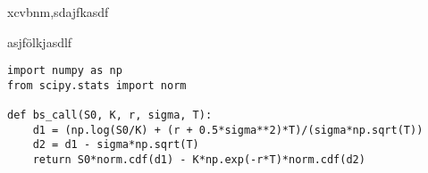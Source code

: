 \begin{tcolorbox}[
  colback=yellow!20,
  colframe=yellow!60!black,
  title={Title},
]
  xcvbnm,sdajfkasdf
\end{tcolorbox}

\begin{tcolorbox}[
  colback=white!10,
  colframe=blue!60,
  title={Title},
]
  asjfölkjasdlf
\end{tcolorbox}

\begin{verbatim}
import numpy as np
from scipy.stats import norm

def bs_call(S0, K, r, sigma, T):
    d1 = (np.log(S0/K) + (r + 0.5*sigma**2)*T)/(sigma*np.sqrt(T))
    d2 = d1 - sigma*np.sqrt(T)
    return S0*norm.cdf(d1) - K*np.exp(-r*T)*norm.cdf(d2)
\end{verbatim}